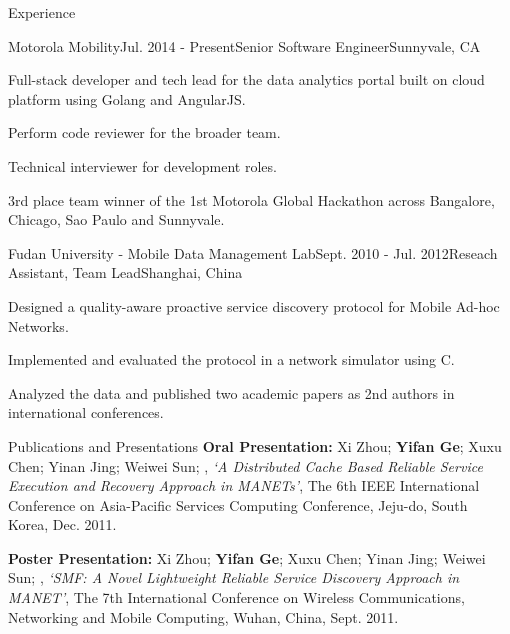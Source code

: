 \documentclass{resume} %
\begin{document}
\begin{rSection}{Experience}

\begin{rSubsection}{Motorola Mobility}{Jul. 2014 - Present}{Senior Software Engineer}{Sunnyvale, CA}
\item Full-stack developer and tech lead for the data analytics portal built on cloud platform using Golang and AngularJS.
\item Perform code reviewer for the broader team.
\item Technical interviewer for development roles.
\item 3rd place team winner of the 1st Motorola Global Hackathon across Bangalore, Chicago, Sao Paulo and Sunnyvale.
\end{rSubsection}


\begin{rSubsection}{Fudan University - Mobile Data Management Lab}{Sept. 2010 - Jul. 2012}{Reseach Assistant, Team Lead}{Shanghai, China}
\item Designed a quality-aware proactive service discovery protocol for Mobile Ad-hoc Networks.
\item Implemented and evaluated the protocol in a network simulator using C.
\item Analyzed the data and published two academic papers as 2nd authors in international conferences.
\end{rSubsection}

\end{rSection}


\begin{rSection}{Publications and Presentations}
{\bf Oral Presentation:} Xi Zhou; {\bf Yifan Ge}; Xuxu Chen; Yinan Jing; Weiwei Sun; , {\em `A Distributed Cache Based Reliable Service Execution and Recovery Approach in MANETs'}, The 6th IEEE International Conference on Asia-Pacific Services Computing Conference, Jeju-do, South Korea, Dec. 2011.

{\bf Poster Presentation:} Xi Zhou; {\bf Yifan Ge}; Xuxu Chen; Yinan Jing; Weiwei Sun; , {\em `SMF: A Novel Lightweight Reliable Service Discovery Approach in MANET'}, The 7th International Conference on Wireless Communications, Networking and Mobile Computing, Wuhan, China, Sept. 2011.
\end{rSection}
\end{document}

